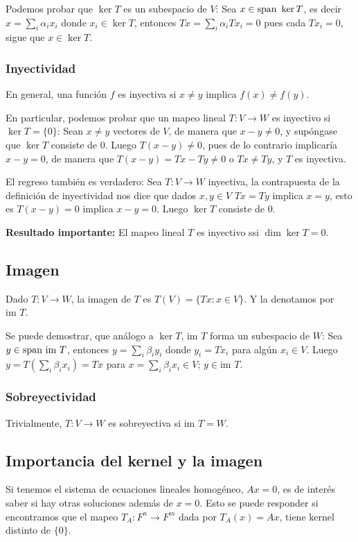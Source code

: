 \documentclass{article}
\begin{document}
Podemos probar que $\ker T$ es un subespacio de $V$:
Sea $x \in \text{span } \ker T$, es decir $x = \sum_i \alpha_i x_i$ donde
$x_i\in \ker T$, entonces $Tx = \sum_i \alpha_i Tx_i = 0$ pues
cada $Tx_i=0$, sigue que $x\in\ker T$.

\subsubsection*{Inyectividad}
En general, una función $f$ es inyectiva si $x\neq y$ implica
$f(x) \neq f(y)$.

En particular, podemos probar que un mapeo lineal $T: V\rightarrow W$
es inyectivo si $\ker T = \{0\}$: Sean $x\neq y$ vectores de $V$,
de manera que $x-y\neq 0$, y supóngase que $\ker T$ consiste de $0$. Luego $T(x-y) \neq 0$, pues de lo contrario implicaría $x-y = 0$,
de manera que $T(x-y) = Tx - Ty \neq 0$ o $Tx \neq Ty$, y $T$ es
inyectiva.

El regreso también es verdadero: Sea $T: V\rightarrow W$ inyectiva,
la contrapuesta de la definición de inyectividad nos dice que
dados $x,y\in V$
$Tx = Ty$ implica $x = y$, esto es $T(x-y) = 0$ implica $x-y = 0$.
Luego $\ker T$ consiste de $0$.

\textbf{Resultado importante:}
El mapeo lineal $T$ es inyectivo ssi $\dim\ker T = 0$.

\newcommand{\im}{\text{im }}
\subsection{Imagen}
Dado $T: V\rightarrow W$, la imagen de $T$ es
$T(V) = \{Tx: x\in V\}$. Y la denotamos por $\im T$.

Se puede demostrar, que análogo a $\ker T$, $\im T$ forma un
subespacio de $W$: Sea $y\in \spn\im T$, entonces
$y=\sum_i \beta_i y_i$ donde $y_i=Tx_i$ para algún $x_i\in V$.
Luego $y=T(\sum_i \beta_i x_i) = Tx$ para
$x=\sum_i \beta_i x_i \in V$; $y\in\im T$.

\subsubsection*{Sobreyectividad}
Trivialmente, $T: V\rightarrow W$ es sobreyectiva si $\im T = W$.

\subsection{Importancia del kernel y la imagen}
Si tenemos el sistema de ecuaciones lineales homogéneo, $Ax=0$,
es de interés saber si hay otras soluciones además de $x=0$.
Esto se puede responder si encontramos que el mapeo $T_A: F^n \rightarrow F^m$
dada por $T_A(x) = Ax$, tiene kernel distinto de $\{0\}$.
\end{document}
